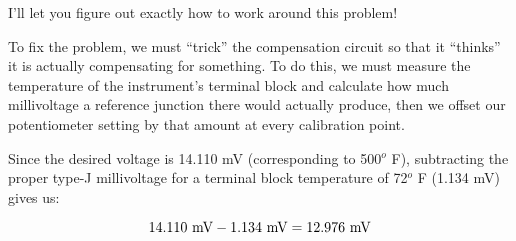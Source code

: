 \vskip 10pt

I'll let you figure out exactly how to work around this problem!







To fix the problem, we must ``trick'' the compensation circuit so that it ``thinks'' it is actually compensating for something.  To do this, we must measure the temperature of the instrument's terminal block and calculate how much millivoltage a reference junction there would actually produce, then we offset our potentiometer setting by that amount at every calibration point.

\vskip 10pt

Since the desired voltage is 14.110 mV (corresponding to 500$^{o}$ F), subtracting the proper type-J millivoltage for a terminal block temperature of 72$^{o}$ F (1.134 mV) gives us:

$$14.110 \hbox{ mV} - 1.134 \hbox{ mV} = 12.976 \hbox{ mV}$$




